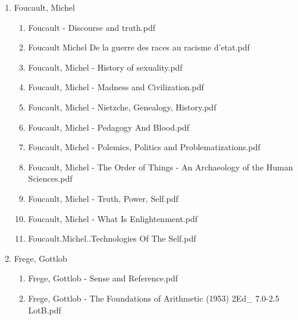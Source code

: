 \documentclass[11pt]{article}
\begin{document}
\begin{enumerate}
\begin{enumerate}
\begin{enumerate}
\begin{enumerate}
\begin{enumerate}
\begin{enumerate}
\item Foucault, Michel
\label{sec-1-1-1-1-7-3-39-13-33}
\begin{enumerate}
\item Foucault - Discourse and truth.pdf
\label{sec-1-1-1-1-7-3-39-13-33-1}

\item Foucault Michel De la guerre des races au racisme d'etat.pdf
\label{sec-1-1-1-1-7-3-39-13-33-2}

\item Foucault, Michel - History of sexuality.pdf
\label{sec-1-1-1-1-7-3-39-13-33-3}

\item Foucault, Michel - Madness and Civilization.pdf
\label{sec-1-1-1-1-7-3-39-13-33-4}

\item Foucault, Michel - Nietzche, Genealogy, History.pdf
\label{sec-1-1-1-1-7-3-39-13-33-5}

\item Foucault, Michel - Pedagogy And Blood.pdf
\label{sec-1-1-1-1-7-3-39-13-33-6}

\item Foucault, Michel - Polemics, Politics and Problematizations.pdf
\label{sec-1-1-1-1-7-3-39-13-33-7}

\item Foucault, Michel - The Order of Things - An Archaeology of the Human Sciences.pdf
\label{sec-1-1-1-1-7-3-39-13-33-8}

\item Foucault, Michel - Truth, Power, Self.pdf
\label{sec-1-1-1-1-7-3-39-13-33-9}

\item Foucault, Michel - What Is Enlightenment.pdf
\label{sec-1-1-1-1-7-3-39-13-33-10}

\item Foucault.Michel..Technologies Of The Self.pdf
\label{sec-1-1-1-1-7-3-39-13-33-11}
\end{enumerate}

\item Frege, Gottlob
\label{sec-1-1-1-1-7-3-39-13-34}
\begin{enumerate}
\item Frege, Gottlob - Sense and Reference.pdf
\label{sec-1-1-1-1-7-3-39-13-34-1}

\item Frege, Gottlob - The Foundations of Arithmetic (1953) 2Ed\_ 7.0-2.5 LotB.pdf
\label{sec-1-1-1-1-7-3-39-13-34-2}


\end{enumerate}
\end{enumerate}
\end{enumerate}
\end{enumerate}
\end{enumerate}
\end{enumerate}
\end{enumerate}
\end{document}
